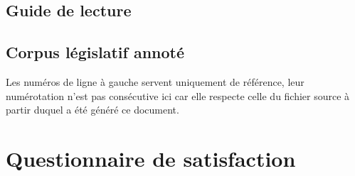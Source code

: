 \documentclass[11pt, french, a4paper]{article}
\begin{document}
\subsection{Guide de lecture}



\subsection{Corpus législatif annoté}

Les numéros de ligne à gauche servent uniquement de référence, leur numérotation
n'est pas consécutive ici car elle respecte celle du fichier source à partir
duquel a été généré ce document.



\section{Questionnaire de satisfaction}


\end{document}
